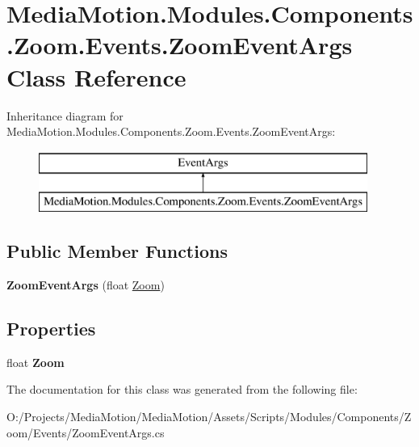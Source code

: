 \hypertarget{class_media_motion_1_1_modules_1_1_components_1_1_zoom_1_1_events_1_1_zoom_event_args}{\section{Media\+Motion.\+Modules.\+Components.\+Zoom.\+Events.\+Zoom\+Event\+Args Class Reference}
\label{class_media_motion_1_1_modules_1_1_components_1_1_zoom_1_1_events_1_1_zoom_event_args}
}
Inheritance diagram for Media\+Motion.\+Modules.\+Components.\+Zoom.\+Events.\+Zoom\+Event\+Args\+:\begin{figure}[H]
\begin{center}
\leavevmode
\includegraphics[height=2.000000cm]{class_media_motion_1_1_modules_1_1_components_1_1_zoom_1_1_events_1_1_zoom_event_args}
\end{center}
\end{figure}
\subsection*{Public Member Functions}
\begin{DoxyCompactItemize}
\item 
\hypertarget{class_media_motion_1_1_modules_1_1_components_1_1_zoom_1_1_events_1_1_zoom_event_args_ac361061684d193b18543ef0ed0f66384}{{\bfseries Zoom\+Event\+Args} (float \hyperlink{class_media_motion_1_1_modules_1_1_components_1_1_zoom_1_1_zoom}{Zoom})}\label{class_media_motion_1_1_modules_1_1_components_1_1_zoom_1_1_events_1_1_zoom_event_args_ac361061684d193b18543ef0ed0f66384}

\end{DoxyCompactItemize}
\subsection*{Properties}
\begin{DoxyCompactItemize}
\item 
\hypertarget{class_media_motion_1_1_modules_1_1_components_1_1_zoom_1_1_events_1_1_zoom_event_args_a40d897e8f6ef604215b4db2ca0066258}{float {\bfseries Zoom}}\label{class_media_motion_1_1_modules_1_1_components_1_1_zoom_1_1_events_1_1_zoom_event_args_a40d897e8f6ef604215b4db2ca0066258}

\end{DoxyCompactItemize}


The documentation for this class was generated from the following file\+:\begin{DoxyCompactItemize}
\item 
O\+:/\+Projects/\+Media\+Motion/\+Media\+Motion/\+Assets/\+Scripts/\+Modules/\+Components/\+Zoom/\+Events/Zoom\+Event\+Args.\+cs\end{DoxyCompactItemize}
